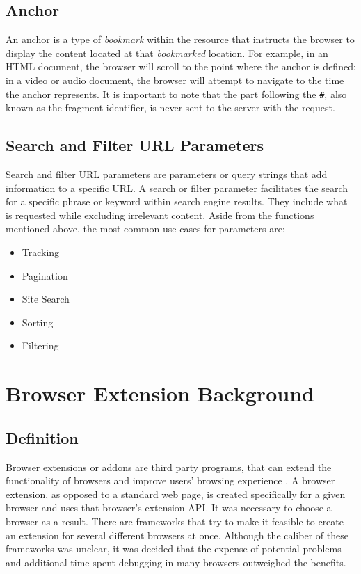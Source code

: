 \subsection*{Anchor}
An anchor is a type of \textit{bookmark} within the resource that instructs the browser to display the content located at that \textit{bookmarked} location. For example, in an HTML document, the browser will scroll to the point where the anchor is defined; in a video or audio document, the browser will attempt to navigate to the time the anchor represents. It is important to note that the part following the \texttt{\#}, also known as the fragment identifier, is never sent to the server with the request.

\subsection{Search and Filter URL Parameters}
Search and filter URL parameters are parameters or query strings that add information to a specific URL. A search or filter parameter facilitates the search for a specific phrase or keyword within search engine results. They include what is requested while excluding irrelevant content. Aside from the functions mentioned above, the most common use cases for parameters are:
\begin{itemize}
  \item Tracking
  \item Pagination
  \item Site Search
  \item Sorting
  \item Filtering
\end{itemize}

\section{Browser Extension Background}

\subsection{Definition}
Browser extensions or addons are third party programs, that can extend the functionality of browsers and improve users' browsing experience \autocite{some2019empoweb}. A browser extension, as opposed to a standard web page, is created specifically for a given browser and uses that browser's extension API. It was necessary to choose a browser as a result. There are frameworks that try to make it feasible to create an extension for several different browsers at once. Although the caliber of these frameworks was unclear, it was decided that the expense of potential problems and additional time spent debugging in many browsers outweighed the benefits.

